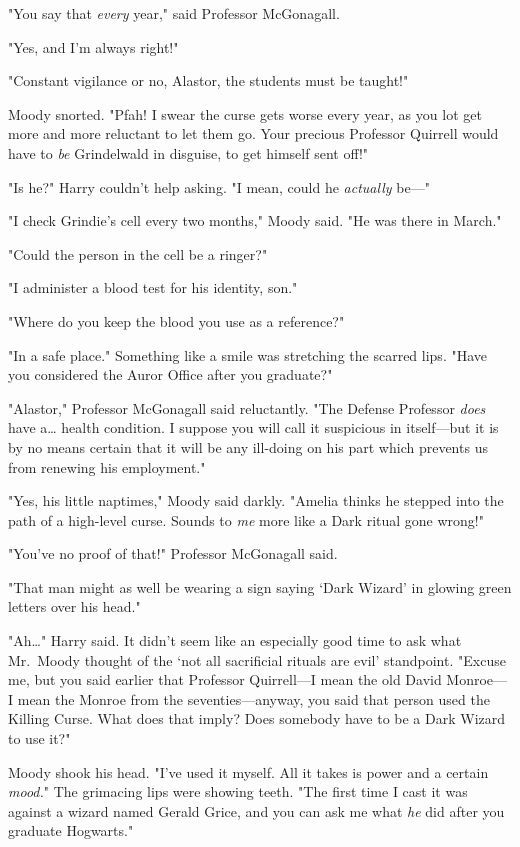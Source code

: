 "You say that \emph{every} year," said Professor McGonagall.

"Yes, and I'm always right!"

"Constant vigilance or no, Alastor, the students must be taught!"

Moody snorted. "Pfah! I swear the curse gets worse every year, as you lot get 
more and more reluctant to let them go. Your precious Professor Quirrell would 
have to \emph{be} Grindelwald in disguise, to get himself sent off!"

"Is he?" Harry couldn't help asking. "I mean, could he \emph{actually} be---"

"I check Grindie's cell every two months," Moody said. "He was there in March."

"Could the person in the cell be a ringer?"

"I administer a blood test for his identity, son."

"Where do you keep the blood you use as a reference?"

"In a safe place." Something like a smile was stretching the scarred lips. 
"Have you considered the Auror Office after you graduate?"

"Alastor," Professor McGonagall said reluctantly. "The Defense Professor 
\emph{does} have a{\ldots} health condition. I suppose you will call it 
suspicious in itself---but it is by no means certain that it will be any 
ill-doing on his part which prevents us from renewing his employment."

"Yes, his little naptimes," Moody said darkly. "Amelia thinks he stepped into 
the path of a high-level curse. Sounds to \emph{me} more like a Dark ritual 
gone wrong!"

"You've no proof of that!" Professor McGonagall said.

"That man might as well be wearing a sign saying `Dark Wizard' in glowing green 
letters over his head."

"Ah{\ldots}" Harry said. It didn't seem like an especially good time to ask 
what Mr.~Moody thought of the `not all sacrificial rituals are evil' 
standpoint. "Excuse me, but you said earlier that Professor Quirrell---I mean 
the old David Monroe---I mean the Monroe from the seventies---anyway, you said 
that person used the Killing Curse. What does that imply? Does somebody have to 
be a Dark Wizard to use it?"

Moody shook his head. "I've used it myself. All it takes is power and a certain 
\emph{mood.}" The grimacing lips were showing teeth. "The first time I cast it 
was against a wizard named Gerald Grice, and you can ask me what \emph{he} did 
after you graduate Hogwarts."

